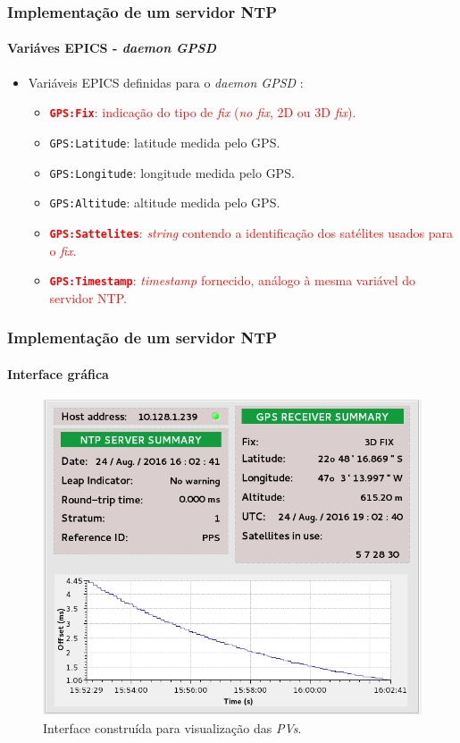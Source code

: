 \begin{frame}
\frametitle{Implementação de um servidor NTP}
\framesubtitle{Variáves EPICS - \textit{daemon GPSD}}

\begin{itemize}
  \item Variáveis EPICS definidas para o \textit{daemon GPSD} :
  \vspace{12pt}
	\begin{itemize}
	\item \textcolor{red}{\textbf{\texttt{GPS:Fix}}: indicação do tipo de
	\textit{fix} (\textit{no fix}, 2D ou 3D \textit{fix}).}
	\item \texttt{GPS:Latitude}: latitude medida pelo GPS.
	\item \texttt{GPS:Longitude}: longitude medida pelo GPS.
	\item \texttt{GPS:Altitude}: altitude medida pelo GPS.
	\item \textcolor{red}{\textbf{\texttt{GPS:Sattelites}}: \textit{string}
	contendo a identificação dos satélites usados para o \textit{fix}.}
	\item \textcolor{red}{\textbf{\texttt{GPS:Timestamp}}: \textit{timestamp}
	fornecido, análogo à mesma variável do servidor NTP.}
	\end{itemize}	    
\end{itemize}
\end{frame}

\begin{frame}
\frametitle{Implementação de um servidor NTP}
\framesubtitle{Interface gráfica} 
\begin{figure}[h]
    \centering
    \includegraphics[scale=0.26]{image/epics-opi-ntpgps}
    \caption {Interface construída para visualização das
    \textit{PVs}.}
    \label{img:ntp-opi} 
\end{figure} 

\end{frame}